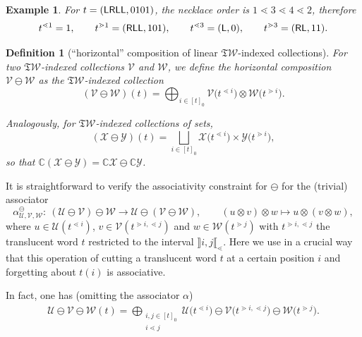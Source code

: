 \documentclass[pdftex]{sigma}
\newcommand{\stdl}{\lessdot}
\newcommand{\stdg}{\gtrdot}
\newcommand{\SWc}{{\mathfrak{T}\mathcal{W}}}
\numberwithin{equation}{section}
\newtheorem{Definition}[Theorem]{Definition}
\newtheorem{Example}[Theorem]{Example}
\begin{document}
\begin{Example}
 For $t = ({\sf L R L L}, 0101)$, the necklace order is $1\stdl 3\stdl 4\stdl 2$, therefore
	\begin{align*}
		 t^{\stdl 1} = 1, \qquad t^{\stdg 1} = ({\sf RLL}, 101),
		 \qquad
		 t^{\stdl 3} = ({\sf L}, 0),\qquad t^{\stdg 3} = ({\sf RL}, 11).
	\end{align*}
\end{Example}
\begin{Definition}[``horizontal'' composition of linear $\SWc$-indexed collections]
	\label{def:ominus}
	For two $\SWc$-indexed collections $\mathcal{V}$ and $\mathcal{W}$, we
	define the {\it horizontal composition} $\mathcal{V} \ominus \mathcal{W}$
	as the $\SWc$-indexed collection
	\begin{equation}\label{eqn:defominus}
		(\mathcal{V} \ominus \mathcal{W})(t) = \bigoplus_{i \in [t]_0} \mathcal{V}\big(t^{\stdl i}\big)\otimes \mathcal{W}\big(t^{\stdg i}\big).
 \end{equation}

Analogously, for $\SWc$-indexed collections of sets,
 \[(\mathcal{X} \ominus \mathcal{Y})(t) = \bigsqcup_{i \in [t]_0} \mathcal{X}\big(t^{\stdl i}\big)\times \mathcal{Y}\big(t^{\stdg i}\big),\]
 so that
 $\mathbb C (\mathcal X\ominus \mathcal Y)=\mathbb C \mathcal X \ominus \mathbb C\mathcal Y$.
\end{Definition}
It is straightforward to verify the associativity constraint for $\ominus$ for the (trivial) associator
\[
	\alpha^{\ominus}_{\mathcal{U},\mathcal{V},\mathcal W}\colon \ (\mathcal{U}\ominus \mathcal{V})\ominus \mathcal W \to \mathcal{U} \ominus (\mathcal{V}\ominus \mathcal W),
	\qquad (u\otimes v) \otimes w \mapsto u \otimes (v\otimes w),
\]
where $u \in \mathcal{U}(t^{\stdl i})$, $v \in \mathcal{V}(t^{\stdg i,\stdl j})$ and $w\in \mathcal{W}(t^{\stdg j})$ with $t^{\stdg i,\stdl j}$ the translucent word $t$ restricted to the interval $\rrbracket i,j\llbracket_{\stdl}$.
Here we use in a crucial way that this operation of cutting a translucent word $t$ at a certain position $i$ and forgetting about $t(i)$ is associative.


In fact, one has (omitting the associator $\alpha$)
\begin{align}\label{eq:horizontal-unbracketed}
	\mathcal{U}\ominus\mathcal{V}\ominus\mathcal{W}(t) = \bigoplus_{\substack{i,j\in [t]_0 \\i \stdl j }} \mathcal{U}\big(t^{\stdl i}\big)\ominus \mathcal{V}\big(t^{\stdg i,\stdl j}\big)\ominus \mathcal W\big(t^{\stdg j}\big).
\end{align}
\end{document}
